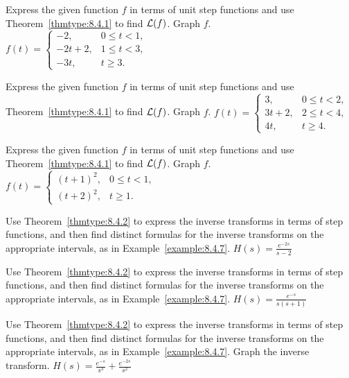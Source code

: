 \documentclass{ximera}
\begin{document}
\begin{problem}\label{exer:8.4.16} Express the given function $f$ in terms of unit step functions and use Theorem~\ref{thmtype:8.4.1} to find ${\cal L}(f)$.  Graph $f$.
$f(t)=\left\{\begin{array}{cl}- 2,&0\le
t<1,\\ -2t+2,&1\le t<3,\\ -3t,&t\ge
3.\end{array}\right.$
\end{problem}

\begin{problem}\label{exer:8.4.17}  Express the given function $f$ in terms of unit step functions and use Theorem~\ref{thmtype:8.4.1} to find ${\cal L}(f)$.  Graph $f$.
$f(t)=\left\{\begin{array}{cl}3,&0\le t<2,\\ 3t+2,&2\le
t<4,\\ 4t,&t\ge
4.\end{array}\right.$
\end{problem}

\begin{problem}\label{exer:8.4.18}  Express the given function $f$ in terms of unit step functions and use Theorem~\ref{thmtype:8.4.1} to find ${\cal L}(f)$.  Graph $f$.
$f(t)=\left\{\begin{array}{ll}(t+1)^2,&0\le t<1,
\\(t+2)^2,&t\ge1.\end{array}\right.$
\end{problem}

\begin{problem}\label{exer:8.4.19} Use Theorem~\ref{thmtype:8.4.2} to express the inverse transforms in terms of step functions, and then find distinct formulas for the inverse transforms on the appropriate intervals, as in
Example~\ref{example:8.4.7}.
$H(s)=\frac{e^{-2s}}{s-2}$
\end{problem}

\begin{problem}\label{exer:8.4.20}
Use Theorem~\ref{thmtype:8.4.2} to express the inverse transforms in terms of step functions, and then find distinct formulas for the inverse transforms on the appropriate intervals, as in
Example~\ref{example:8.4.7}.
$H(s)=\frac{e^{-s}}{s(s+1)}$
\end{problem}

\begin{problem}\label{exer:8.4.21}
Use Theorem~\ref{thmtype:8.4.2} to express the inverse transforms in terms of step functions, and then find distinct formulas for the inverse transforms on the appropriate intervals, as in
Example~\ref{example:8.4.7}.  Graph the inverse transform. 
$H(s)=\frac{e^{-s}}{s^3}+
\frac{e^{-2s}}{s^2}$
\end{problem}
\end{document}
